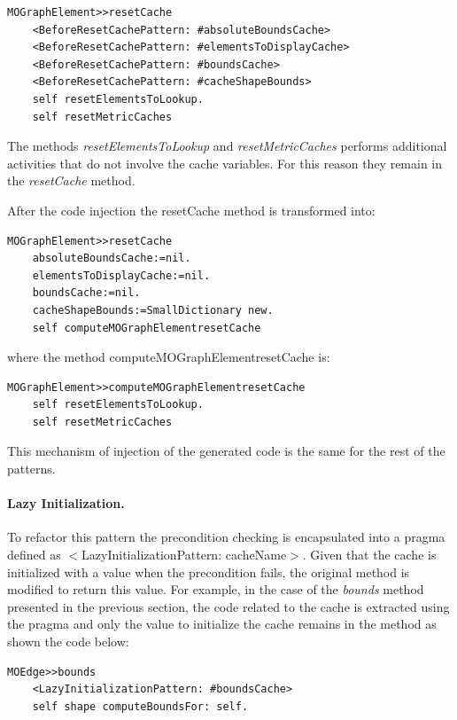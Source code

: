 \documentclass[preprint,10pt]{sigplanconf}
\begin{document}
\begin{lstlisting} 
MOGraphElement>>resetCache 
	<BeforeResetCachePattern: #absoluteBoundsCache> 
	<BeforeResetCachePattern: #elementsToDisplayCache>
	<BeforeResetCachePattern: #boundsCache> 
	<BeforeResetCachePattern: #cacheShapeBounds> 
	self resetElementsToLookup. 
	self resetMetricCaches
\end{lstlisting}

The methods \emph{resetElementsToLookup} and \emph{resetMetricCaches} 
performs additional activities that do not involve the cache variables. For this reason they remain in the \emph{resetCache} method.

After the code injection the resetCache method is transformed into:

\begin{lstlisting} 
MOGraphElement>>resetCache 
	absoluteBoundsCache:=nil.
	elementsToDisplayCache:=nil. 
	boundsCache:=nil. 
	cacheShapeBounds:=SmallDictionary new. 
	self computeMOGraphElementresetCache 
\end{lstlisting}

where the method computeMOGraphElementresetCache is:

\begin{lstlisting} 
MOGraphElement>>computeMOGraphElementresetCache
	self resetElementsToLookup. 
	self resetMetricCaches 
\end{lstlisting}

This mechanism of injection of the generated code is the same for
the rest of the patterns.

\paragraph{Lazy Initialization.} To refactor this pattern
the precondition checking is encapsulated into a pragma defined as
$<$LazyInitializationPattern: cacheName$>$. Given that
the cache is initialized with a value when the precondition fails,
the original method is modified to return this value. For example,
in the case of the \emph{bounds} method presented in the previous
section, the code related to the cache is extracted using the pragma
and only the value to initialize the cache remains in the method as
shown the code below:

\begin{lstlisting} 
MOEdge>>bounds 
	<LazyInitializationPattern: #boundsCache> 
	self shape computeBoundsFor: self. 
\end{lstlisting}
\end{document}
